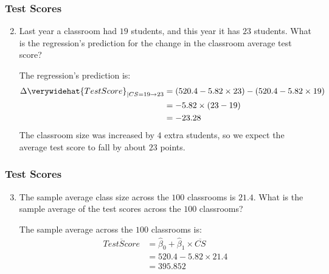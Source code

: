\begin{frame}
\frametitle{Test Scores}
\ask

\begin{enumerate}\setcounter{enumi}{1}

\item Last year a classroom had $19$ students, and this year it has $23$ students. What is the regression's prediction for the change in the classroom average test score?

\begin{answer}
The regression's prediction is:
\begin{align*}
\Delta\verywidehat{TestScore}_{|CS=19\to23}
  & = (520.4 - 5.82 \times 23) - (520.4 - 5.82 \times 19)\\
  & = - 5.82 \times (23-19)\\
  & = -23.28
\end{align*}
The classroom size was increased by $4$ extra students, so we expect the average test score to fall by about $23$ points. 
\end{answer}

\end{enumerate}
\end{frame}


\begin{frame}
\frametitle{Test Scores}
\ask

\begin{enumerate}\setcounter{enumi}{2}

\item The sample average class size across the $100$ classrooms is $21.4$. What is the sample average of the test scores across the $100$ classrooms?

\begin{answer}
The sample average across the $100$ classrooms is:
\begin{align*}
\overline{TestScore}
  & = \hat{\beta}_{0} +  \hat{\beta}_{1} \times \overline{CS}\\
  & = 520.4 - 5.82 \times 21.4\\
  & = 395.852
\end{align*}
\end{answer}

\end{enumerate}
\end{frame}


